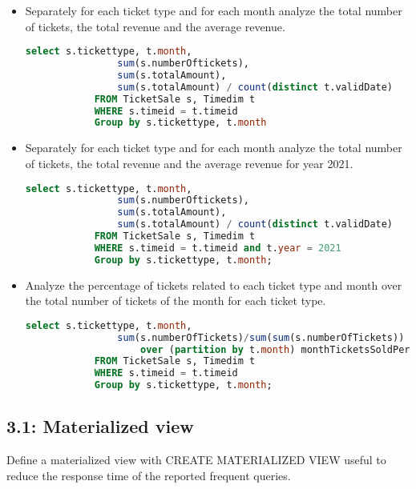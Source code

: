 \begin{question}
\begin{itemize}
\begin{lstlisting}[language=SQL]
       \end{lstlisting}
       \item
       Separately for each ticket type and for each month analyze the total number of
       tickets, the total revenue and the average revenue.
       \begin{lstlisting}[language = SQL]
            select s.tickettype, t.month,
                sum(s.numberOftickets),
                sum(s.totalAmount),
                sum(s.totalAmount) / count(distinct t.validDate)
            FROM TicketSale s, Timedim t
            WHERE s.timeid = t.timeid
            Group by s.tickettype, t.month
       \end{lstlisting}
       \item
       Separately for each ticket type and for each month analyze the total number of
       tickets, the total revenue and the average revenue for year 2021.
       \begin{lstlisting}[language = SQL]
            select s.tickettype, t.month,
                sum(s.numberOftickets),
                sum(s.totalAmount),
                sum(s.totalAmount) / count(distinct t.validDate)
            FROM TicketSale s, Timedim t
            WHERE s.timeid = t.timeid and t.year = 2021
            Group by s.tickettype, t.month;
       \end{lstlisting}
       \item
       Analyze the percentage of tickets related to each ticket type and month over the
       total number of tickets of the month for each ticket type.
       \begin{lstlisting}[language = SQL]
            select s.tickettype, t.month,
                sum(s.numberOfTickets)/sum(sum(s.numberOfTickets))
                    over (partition by t.month) monthTicketsSoldPercentage
            FROM TicketSale s, Timedim t
            WHERE s.timeid = t.timeid
            Group by s.tickettype, t.month;
       \end{lstlisting}
   \end{itemize}
\end{question}

\subsection{3.1: Materialized view}

\begin{question}
    Define a materialized view with CREATE MATERIALIZED VIEW useful to
    reduce the response time of the reported frequent queries.
\end{question}

